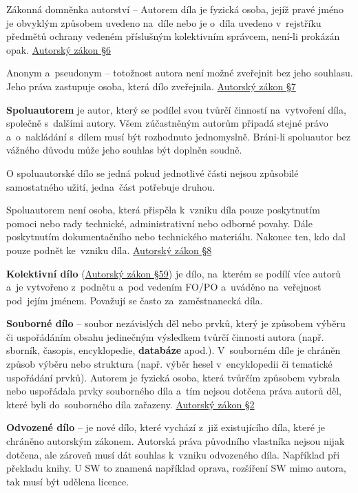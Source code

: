 Zákonná domněnka autorství -- Autorem díla je fyzická osoba, jejíž pravé jméno je obvyklým způsobem uvedeno na~díle nebo je o~díla uvedeno v~rejstříku předmětů ochrany vedeném příslušným kolektivním správcem, není-li prokázán opak. \href{https://www.zakonyprolidi.cz/cs/2000-121#p6}{Autorský zákon §6}

Anonym a~pseudonym -- totožnost autora není možné zveřejnit bez jeho souhlasu. Jeho práva zastupuje osoba, která dílo zveřejnila. \href{https://www.zakonyprolidi.cz/cs/2000-121#p7}{Autorský zákon §7}

\textbf{Spoluautorem} je autor, který se podílel svou tvůrčí činností na~vytvoření díla, společně s~dalšími autory. Všem zúčastněným autorům připadá stejné právo a~o~nakládání s~dílem musí být rozhodnuto jednomyslně. Bráni-li spoluautor bez vážného důvodu může jeho souhlas být doplněn soudně.

O spoluautorské dílo se jedná pokud jednotlivé části nejsou způsobilé samostatného užití, jedna~část potřebuje druhou.

Spoluautorem není osoba, která přispěla k~vzniku díla pouze poskytnutím pomoci nebo rady technické, administrativní nebo odborné povahy. Dále poskytnutím dokumentačního nebo technického materiálu. Nakonec ten, kdo dal pouze podnět ke~vzniku díla. \href{https://www.zakonyprolidi.cz/cs/2000-121#p8}{Autorský zákon §8}

\textbf{Kolektivní dílo} (\href{https://www.zakonyprolidi.cz/cs/2000-121#p59}{Autorský zákon §59}) je dílo, na~kterém se podílí více autorů a~je vytvořeno z~podnětu a~pod vedením FO/PO a~uváděno na~veřejnost pod~jejím jménem. Považují se často za~zaměstnanecká díla.

\textbf{Souborné dílo} -- soubor nezávislých děl nebo prvků, který je způsobem výběru či uspořádáním obsahu jedinečným výsledkem tvůrčí činnosti autora (např. sborník, časopis, encyklopedie, \textbf{databáze} apod.). V~souborném díle je chráněn způsob výběru nebo struktura (např. výběr hesel v~encyklopedii či tematické uspořádání prvků). Autorem je fyzická osoba, která tvůrčím způsobem vybrala nebo uspořádala prvky souborného díla a~tím nejsou dotčena práva autorů děl, které byli do~souborného díla zařazeny. \href{https://www.zakonyprolidi.cz/cs/2000-121#p2}{Autorský zákon §2}

\textbf{Odvozené dílo} -- je nové dílo, které vychází z~již existujícího díla, které je chráněno autorským zákonem. Autorská práva původního vlastníka nejsou nijak dotčena, ale zároveň musí dát souhlas k~vzniku odvozeného díla. Například při překladu knihy. U SW to znamená například oprava, rozšíření SW mimo autora, tak musí být udělena licence.

